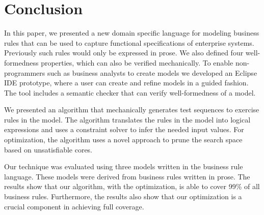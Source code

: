 \section{Conclusion}

In this paper, we presented a new domain specific language for
modeling business rules that can be used to capture functional
specifications of enterprise systems. Previously such rules would only
be expressed in prose. We also defined four well-formedness properties,
which can also be verified mechanically. To enable non-programmers 
such as business analysts to create models we
developed an Eclipse IDE prototype, where a user can create and refine
models in a guided fashion. The tool includes a semantic checker that
can verify well-formedness of a model.

We presented an algorithm that mechanically generates test sequences to
exercise rules in the model. The algorithm translates the rules in the
model into logical expressions and uses a constraint solver to infer
the needed input values. For optimization, the algorithm uses a novel
approach to prune the search space based on unsatisfiable cores. 

Our technique was evaluated using three models written in the
business rule language. These models were derived from business rules
written in prose. The results show that our algorithm, with the
optimization, is able to cover 99\% of all business rules. Furthermore,
the results also show that our optimization is a crucial component in
achieving full coverage.
